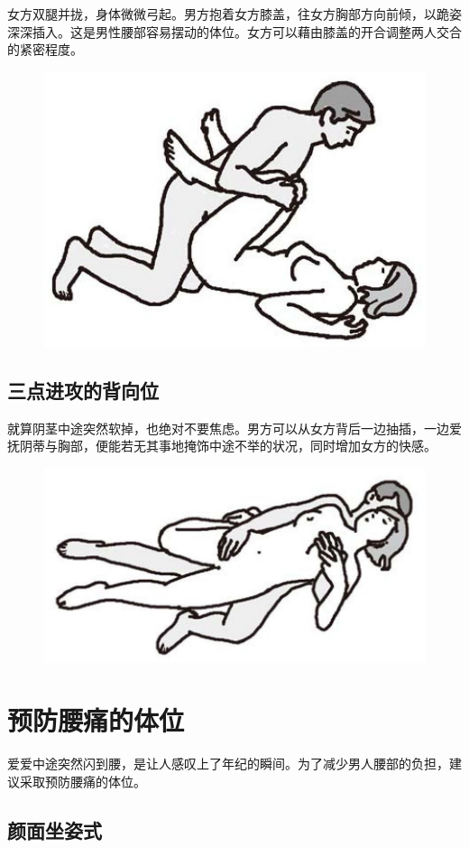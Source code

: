 \documentclass[12pt,UTF8]{ctexbook}
\begin{document}
女方双腿并拢，身体微微弓起。男方抱着女方膝盖，往女方胸部方向前倾，以跪姿深深插入。这是男性腰部容易摆动的体位。女方可以藉由膝盖的开合调整两人交合的紧密程度。

\begin{figure}[htbp]
	\centering
	\includegraphics[width=0.7\linewidth]{tw7}
	\caption{}
	\label{fig:1}
\end{figure}

\subsection{三点进攻的背向位}

就算阴茎中途突然软掉，也绝对不要焦虑。男方可以从女方背后一边抽插，一边爱抚阴蒂与胸部，便能若无其事地掩饰中途不举的状况，同时增加女方的快感。

\begin{figure}[htbp]
	\centering
	\includegraphics[width=0.7\linewidth]{tw8}
	\caption{}
	\label{fig:1}
\end{figure}

\section{预防腰痛的体位}

爱爱中途突然闪到腰，是让人感叹上了年纪的瞬间。为了减少男人腰部的负担，建议采取预防腰痛的体位。

\subsection{颜面坐姿式}
\end{document}
